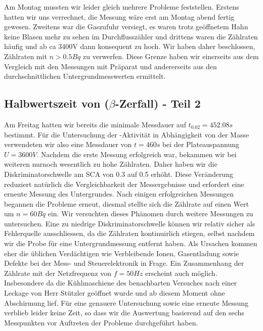 Am Montag mussten wir leider gleich mehrere Probleme feststellen. Erstens hatten wir uns verrechnet, die Messung wäre erst am Montag abend fertig gewesen. Zweitens war die Gaszufuhr versiegt, es waren trotz geöffnetem Hahn keine Blasen mehr zu sehen im Durchflusszähler und drittens waren die Zählraten häufig und ab ca 3400V dann konsequent zu hoch. Wir haben daher beschlossen, Zählraten mit $ n > 0.5 Bq$ zu verwerfen. Diese Grenze haben wir einerseits aus dem Vergleich mit den Messungen mit Präparat und andererseits aus den durchschnittlichen Untergrundmesswerten ermittelt.


\subsection{Halbwertszeit von  ($\beta$-Zerfall) - Teil 2}

Am Freitag hatten wir bereits die minimale Messdauer auf $t_{0.02} = 452.08 s$ bestimmt. Für die Untersuchung der -Aktivität in Abhängigkeit von der Masse verwendeten wir also eine Messdauer von $t = 460s$ bei der Plateauspannung $U = 3600V$.
Nachdem die erste Messung erfolgreich war, bekammen wir bei weiteren nurnoch wesentlich zu hohe Zählraten. Daher haben wir die Diskriminatorschwelle am SCA von 0.3 auf 0.5 erhöht. Diese Veränderung reduziert natürlich die Vergleichbarkeit der Messergebnisse und erfordert eine erneute Messung des Untergrundes. Nach einigen erfolgreichen Messungen begannen die Probleme erneut,
diesmal stellte sich die Zählrate auf einen Wert um $n = 60 Bq$ ein. Wir versuchten dieses Phänomen durch weitere Messungen zu untersuchen.
Eine zu niedrige Diskriminatorschwelle können wir relativ sicher als Fehlerquelle ausschliessen, da die Zählraten kontinuirlich stiegen, selbst nachdem wir die Probe für eine Untergrundmessung entfernt haben. Als Ursachen kommen eher die üblichen Verdächtigen wie Verbleibende Ionen, Gasentladung sowie Defekte bei der Mess- und Steuerelektronik in Frage.
Ein Zusammenhang der Zählrate mit der Netzfrequenz von $f = 50Hz$ erscheint auch möglich. Insbesondere da die Kühlmaschiene des benachbarten Versuches nach einer Leckage von Herr Stützler geöffnet wurde und ab diesem Moment ohne Abschirmung lief.
Für eine genauere Untersuchung sowie eine erneute Messung verblieb leider keine Zeit, so dass wir die Auswertung basierend auf den sechs Messpunkten vor Auftreten der Probleme durchgeführt haben.


